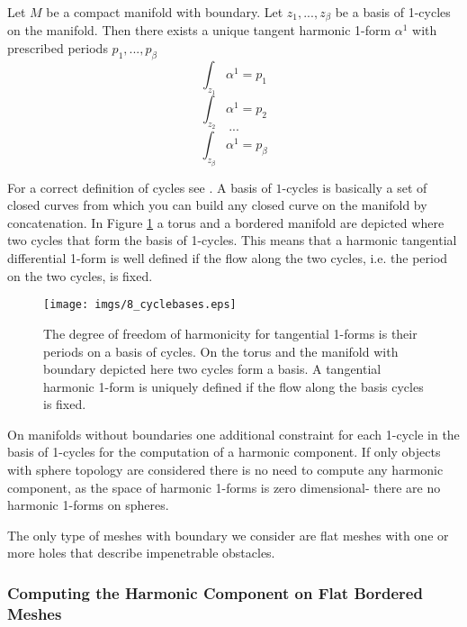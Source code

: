 \begin{thm}
Let $M$ be a compact manifold with boundary. Let $z_1,...,z_\beta$ be a basis of 1-cycles on the manifold. Then there exists a unique tangent harmonic 1-form $\alpha^1$ with prescribed periods $p_1,...,p_{\beta}$
\[\int_{z_1}\alpha^1 = p_1\]
\[\int_{z_2}\alpha^1 =p_2\]
\[...\]
\[\int_{z_\beta}\alpha^1 = p_{\beta}\]
\end{thm}

For a correct definition of cycles see \cite{FRANKEL11}. A basis of $1$-cycles is basically a set of closed curves from which you can build any closed curve on the manifold by concatenation. In Figure \ref{fig:fd_cycles} a torus and a bordered manifold are depicted where two cycles that form the basis of 1-cycles. This means that a harmonic tangential differential 1-form is well defined if the flow along the two cycles, i.e. the period on the two cycles, is fixed. 

\begin{figure}%
\begin{center}
\texttt{[image: imgs/8\_cyclebases.eps]}%
\end{center}
\caption{The degree of freedom of harmonicity for  tangential 1-forms is their periods on a basis of cycles. On the torus and the manifold with boundary depicted here two cycles form a basis. A tangential harmonic 1-form is uniquely defined if the flow along the basis cycles is fixed. }%
\label{fig:fd_cycles}%
\end{figure}


On manifolds without boundaries one additional constraint for each 1-cycle in the basis of 1-cycles for the computation of a harmonic component. If only objects with sphere topology are considered there is no need to compute any harmonic component, as the space of harmonic 1-forms is zero dimensional- there are no harmonic 1-forms on spheres. 

The only type of meshes with boundary we consider are flat meshes with one or more holes that describe impenetrable obstacles.

\subsubsection{Computing the Harmonic Component on Flat Bordered Meshes}

